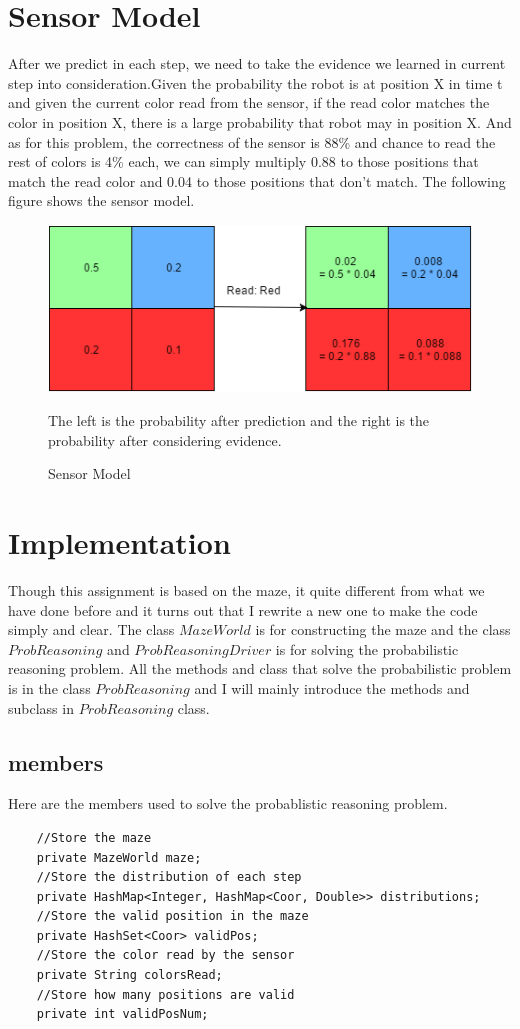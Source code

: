 \documentclass{article}
\begin{document}
\section{Sensor Model}
After we predict in each step, we need to take the evidence we learned in current step into consideration.Given the probability the robot is at position X in time t and given the current color read from the sensor, if the read color matches the color in position X, there is a large probability that robot may in position X. And as for this problem, the correctness of the sensor is 88\% and chance to read the rest of colors is 4\% each, we can simply multiply 0.88 to those positions that match the read color and 0.04 to those positions that don't match. The following figure shows the sensor model.
\begin{figure}[H]
\centering
\includegraphics[width=0.7\linewidth]{sensor_model}
\caption{Sensor Model}
\medskip
\small
The left is the probability after prediction and the right is the probability after considering evidence.
\end{figure}

\section{Implementation}
Though this assignment is based on the maze, it quite different from what we have done before and it turns out that I rewrite a new one to make the code simply and clear. The class $MazeWorld$ is for constructing the maze and the class $ProbReasoning$ and $ProbReasoningDriver$ is for solving the probabilistic reasoning problem. All the methods and class that solve the probabilistic problem is in the class $ProbReasoning$ and I will mainly introduce the methods and subclass in $ProbReasoning$ class.

\subsection{members}
Here are the members used to solve the probablistic reasoning problem.
\begin{lstlisting}
	//Store the maze
	private MazeWorld maze;
	//Store the distribution of each step
	private HashMap<Integer, HashMap<Coor, Double>> distributions;
	//Store the valid position in the maze
	private HashSet<Coor> validPos;
	//Store the color read by the sensor
	private String colorsRead;
	//Store how many positions are valid
	private int validPosNum;
\end{lstlisting}
\end{document}
